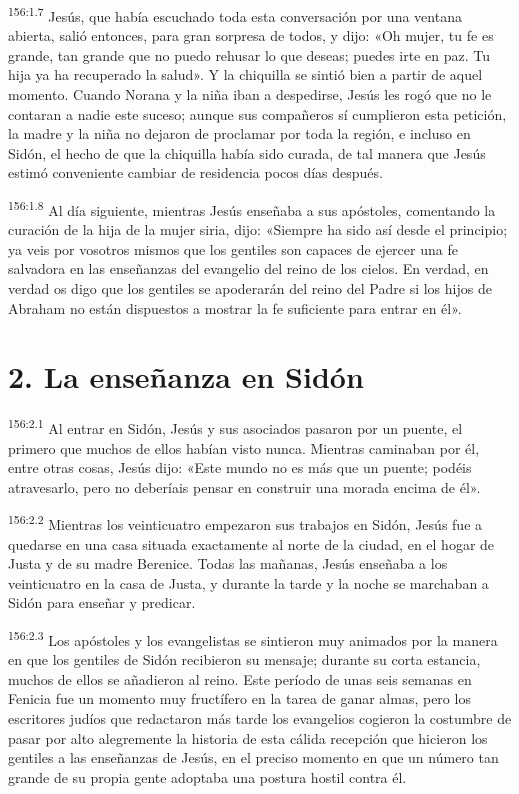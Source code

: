\par 
\textsuperscript{156:1.7} Jesús, que había escuchado toda esta conversación por una ventana abierta, salió entonces, para gran sorpresa de todos, y dijo: «Oh mujer, tu fe es grande, tan grande que no puedo rehusar lo que deseas; puedes irte en paz. Tu hija ya ha recuperado la salud». Y la chiquilla se sintió bien a partir de aquel momento. Cuando Norana y la niña iban a despedirse, Jesús les rogó que no le contaran a nadie este suceso; aunque sus compañeros sí cumplieron esta petición, la madre y la niña no dejaron de proclamar por toda la región, e incluso en Sidón, el hecho de que la chiquilla había sido curada, de tal manera que Jesús estimó conveniente cambiar de residencia pocos días después.

\par 
\textsuperscript{156:1.8} Al día siguiente, mientras Jesús enseñaba a sus apóstoles, comentando la curación de la hija de la mujer siria, dijo: «Siempre ha sido así desde el principio; ya veis por vosotros mismos que los gentiles son capaces de ejercer una fe salvadora en las enseñanzas del evangelio del reino de los cielos. En verdad, en verdad os digo que los gentiles se apoderarán del reino del Padre si los hijos de Abraham no están dispuestos a mostrar la fe suficiente para entrar en él».

\section*{2. La enseñanza en Sidón}
\par 
\textsuperscript{156:2.1} Al entrar en Sidón, Jesús y sus asociados pasaron por un puente, el primero que muchos de ellos habían visto nunca. Mientras caminaban por él, entre otras cosas, Jesús dijo: «Este mundo no es más que un puente; podéis atravesarlo, pero no deberíais pensar en construir una morada encima de él».

\par 
\textsuperscript{156:2.2} Mientras los veinticuatro empezaron sus trabajos en Sidón, Jesús fue a quedarse en una casa situada exactamente al norte de la ciudad, en el hogar de Justa y de su madre Berenice. Todas las mañanas, Jesús enseñaba a los veinticuatro en la casa de Justa, y durante la tarde y la noche se marchaban a Sidón para enseñar y predicar.

\par 
\textsuperscript{156:2.3} Los apóstoles y los evangelistas se sintieron muy animados por la manera en que los gentiles de Sidón recibieron su mensaje; durante su corta estancia, muchos de ellos se añadieron al reino. Este período de unas seis semanas en Fenicia fue un momento muy fructífero en la tarea de ganar almas, pero los escritores judíos que redactaron más tarde los evangelios cogieron la costumbre de pasar por alto alegremente la historia de esta cálida recepción que hicieron los gentiles a las enseñanzas de Jesús, en el preciso momento en que un número tan grande de su propia gente adoptaba una postura hostil contra él.


